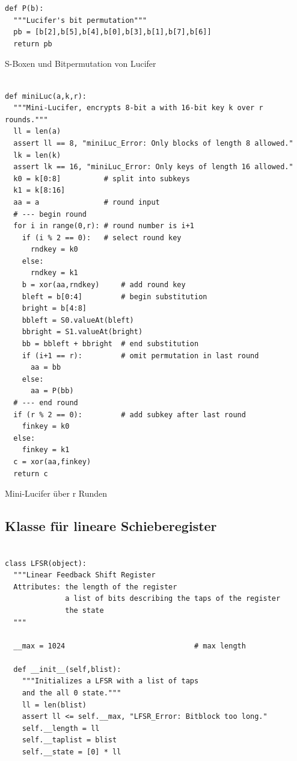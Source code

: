 \begin{refsegment}
\begin{sagecode}
\begin{verbatim}
def P(b):
  """Lucifer's bit permutation"""
  pb = [b[2],b[5],b[4],b[0],b[3],b[1],b[7],b[6]]
  return pb
\end{verbatim}
\caption{S-Boxen und Bitpermutation von Lucifer
   }\label{Sage-code-bool-Luc}
\end{sagecode}
\clearpage

\begin{sagecode}
\begin{verbatim}

def miniLuc(a,k,r):
  """Mini-Lucifer, encrypts 8-bit a with 16-bit key k over r rounds."""
  ll = len(a)
  assert ll == 8, "miniLuc_Error: Only blocks of length 8 allowed."
  lk = len(k)
  assert lk == 16, "miniLuc_Error: Only keys of length 16 allowed."
  k0 = k[0:8]          # split into subkeys
  k1 = k[8:16]
  aa = a               # round input
  # --- begin round
  for i in range(0,r): # round number is i+1
    if (i % 2 == 0):   # select round key
      rndkey = k0
    else:
      rndkey = k1
    b = xor(aa,rndkey)     # add round key
    bleft = b[0:4]         # begin substitution
    bright = b[4:8]
    bbleft = S0.valueAt(bleft)
    bbright = S1.valueAt(bright)
    bb = bbleft + bbright  # end substitution
    if (i+1 == r):         # omit permutation in last round
      aa = bb
    else:
      aa = P(bb)
  # --- end round
  if (r % 2 == 0):         # add subkey after last round
    finkey = k0
  else:
    finkey = k1
  c = xor(aa,finkey)
  return c
\end{verbatim}
\caption{Mini-Lucifer über r Runden}\label{Sage-code-bool-MiniLuc}
\end{sagecode}
\clearpage

\subsection{Klasse für lineare Schieberegister}\label{ss-bool-lfsrclass}

\begin{sagecode}
\begin{verbatim}

class LFSR(object):
  """Linear Feedback Shift Register
  Attributes: the length of the register
              a list of bits describing the taps of the register
              the state
  """

  __max = 1024                              # max length

  def __init__(self,blist):
    """Initializes a LFSR with a list of taps
    and the all 0 state."""
    ll = len(blist)
    assert ll <= self.__max, "LFSR_Error: Bitblock too long."
    self.__length = ll
    self.__taplist = blist
    self.__state = [0] * ll


\end{verbatim}
\end{sagecode}
\end{refsegment}

